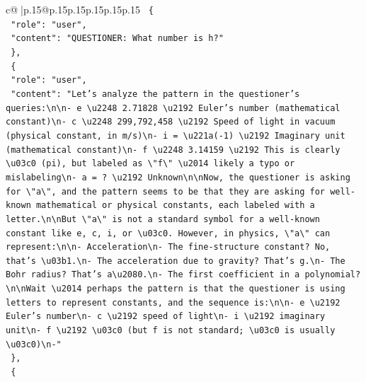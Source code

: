 \documentclass{article}
\begin{document}
{\begin{supertabular}{c@{$\;$}|p{.15\linewidth}@{}p{.15\linewidth}p{.15\linewidth}p{.15\linewidth}p{.15\linewidth}p{.15\linewidth}}
{{{\texttt{  \{} \\
\texttt{    "role": "user",} \\
\texttt{    "content": "QUESTIONER: What number is h?"} \\
\texttt{  \},} \\
\texttt{  \{} \\
\texttt{    "role": "user",} \\
\texttt{    "content": "Let's analyze the pattern in the questioner's queries:\textbackslash{}n\textbackslash{}n{-} e \textbackslash{}u2248 2.71828 \textbackslash{}u2192 Euler's number (mathematical constant)\textbackslash{}n{-} c \textbackslash{}u2248 299,792,458 \textbackslash{}u2192 Speed of light in vacuum (physical constant, in m/s)\textbackslash{}n{-} i = \textbackslash{}u221a({-}1) \textbackslash{}u2192 Imaginary unit (mathematical constant)\textbackslash{}n{-} f \textbackslash{}u2248 3.14159 \textbackslash{}u2192 This is clearly \textbackslash{}u03c0 (pi), but labeled as \textbackslash{}"f\textbackslash{}" \textbackslash{}u2014 likely a typo or mislabeling\textbackslash{}n{-} a = ? \textbackslash{}u2192 Unknown\textbackslash{}n\textbackslash{}nNow, the questioner is asking for \textbackslash{}"a\textbackslash{}", and the pattern seems to be that they are asking for well{-}known mathematical or physical constants, each labeled with a letter.\textbackslash{}n\textbackslash{}nBut \textbackslash{}"a\textbackslash{}" is not a standard symbol for a well{-}known constant like e, c, i, or \textbackslash{}u03c0. However, in physics, \textbackslash{}"a\textbackslash{}" can represent:\textbackslash{}n\textbackslash{}n{-} Acceleration\textbackslash{}n{-} The fine{-}structure constant? No, that's \textbackslash{}u03b1.\textbackslash{}n{-} The acceleration due to gravity? That's g.\textbackslash{}n{-} The Bohr radius? That's a\textbackslash{}u2080.\textbackslash{}n{-} The first coefficient in a polynomial?\textbackslash{}n\textbackslash{}nWait \textbackslash{}u2014 perhaps the pattern is that the questioner is using letters to represent constants, and the sequence is:\textbackslash{}n\textbackslash{}n{-} e \textbackslash{}u2192 Euler's number\textbackslash{}n{-} c \textbackslash{}u2192 speed of light\textbackslash{}n{-} i \textbackslash{}u2192 imaginary unit\textbackslash{}n{-} f \textbackslash{}u2192 \textbackslash{}u03c0 (but f is not standard; \textbackslash{}u03c0 is usually \textbackslash{}u03c0)\textbackslash{}n{-}"} \\
\texttt{  \},} \\
\texttt{  \{} \\
}}}
\end{supertabular}}
\end{document}
